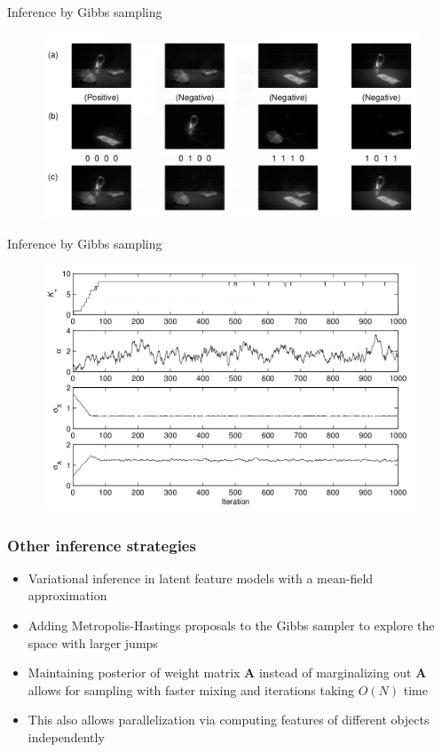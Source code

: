 \documentclass[13pt]{beamer}
\begin{document}
\begin{frame}{Inference by Gibbs sampling} 
\begin{figure}
\begin{center}
    \includegraphics[scale=0.4]{./img/ibp-inference-reconstruction.png}
\end{center}
\end{figure}   
\end{frame}
\begin{frame}{Inference by Gibbs sampling} 
\begin{figure}
\begin{center}
    \includegraphics[scale=0.4]{./img/ibp-inference-example.png}
\end{center}
\end{figure}   
\end{frame}
\begin{frame}
    \frametitle{Other inference strategies}
\begin{itemize}
\item Variational inference in latent feature models with a mean-field approximation
\item Adding Metropolis-Hastings proposals to the Gibbs sampler to explore the space with larger jumps
\item Maintaining posterior of weight matrix $\mathbf{A}$ instead of marginalizing out $\mathbf{A}$ 
    allows for sampling with faster mixing and iterations taking $O(N)$ time
\item This also allows parallelization via computing features of different objects independently 
\end{itemize}
\end{frame}
\end{document}

